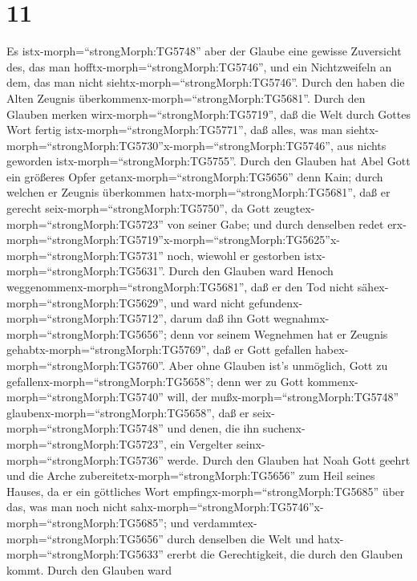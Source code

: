 \hypertarget{section-10}{%
\section{11}\label{section-10}}

 Es istx-morph=``strongMorph:TG5748'' aber der Glaube eine
gewisse Zuversicht des, das man hofftx-morph=``strongMorph:TG5746'', und
ein Nichtzweifeln an dem, das man nicht
siehtx-morph=``strongMorph:TG5746''.  Durch den haben die
Alten Zeugnis überkommenx-morph=``strongMorph:TG5681''. 
Durch den Glauben merken wirx-morph=``strongMorph:TG5719'', daß die Welt
durch Gottes Wort fertig istx-morph=``strongMorph:TG5771'', daß alles,
was man
siehtx-morph=``strongMorph:TG5730''x-morph=``strongMorph:TG5746'', aus
nichts geworden istx-morph=``strongMorph:TG5755''.  Durch
den Glauben hat Abel Gott ein größeres Opfer
getanx-morph=``strongMorph:TG5656'' denn Kain; durch welchen er Zeugnis
überkommen hatx-morph=``strongMorph:TG5681'', daß er gerecht
seix-morph=``strongMorph:TG5750'', da Gott
zeugtex-morph=``strongMorph:TG5723'' von seiner Gabe; und durch
denselben redet
erx-morph=``strongMorph:TG5719''\textbar x-morph=``strongMorph:TG5625''x-morph=``strongMorph:TG5731''
noch, wiewohl er gestorben istx-morph=``strongMorph:TG5631''.
 Durch den Glauben ward Henoch
weggenommenx-morph=``strongMorph:TG5681'', daß er den Tod nicht
sähex-morph=``strongMorph:TG5629'', und ward nicht
gefundenx-morph=``strongMorph:TG5712'', darum daß ihn Gott
wegnahmx-morph=``strongMorph:TG5656''; denn vor seinem Wegnehmen hat er
Zeugnis gehabtx-morph=``strongMorph:TG5769'', daß er Gott gefallen
habex-morph=``strongMorph:TG5760''.  Aber ohne Glauben ist's
unmöglich, Gott zu gefallenx-morph=``strongMorph:TG5658''; denn wer zu
Gott kommenx-morph=``strongMorph:TG5740'' will, der
mußx-morph=``strongMorph:TG5748'' glaubenx-morph=``strongMorph:TG5658'',
daß er seix-morph=``strongMorph:TG5748'' und denen, die ihn
suchenx-morph=``strongMorph:TG5723'', ein Vergelter
seinx-morph=``strongMorph:TG5736'' werde.  Durch den Glauben
hat Noah Gott geehrt und die Arche
zubereitetx-morph=``strongMorph:TG5656'' zum Heil seines Hauses, da er
ein göttliches Wort empfingx-morph=``strongMorph:TG5685'' über das, was
man noch nicht
sahx-morph=``strongMorph:TG5746''x-morph=``strongMorph:TG5685''; und
verdammtex-morph=``strongMorph:TG5656'' durch denselben die Welt und
hatx-morph=``strongMorph:TG5633'' ererbt die Gerechtigkeit, die durch
den Glauben kommt.  Durch den Glauben ward
